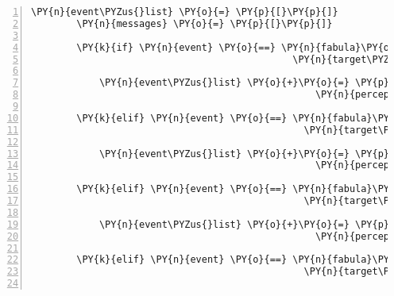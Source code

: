 \begin{Verbatim}[commandchars=\\\{\},numbers=left,firstnumber=1,stepnumber=1]
        \PY{n}{event\PYZus{}list} \PY{o}{=} \PY{p}{[}\PY{p}{]}
        \PY{n}{messages} \PY{o}{=} \PY{p}{[}\PY{p}{]}

        \PY{k}{if} \PY{n}{event} \PY{o}{==} \PY{n}{fabula}\PY{o}{.}\PY{n}{TriesToLookAtEvent}\PY{p}{(}\PY{n}{identifier}\PY{o}{=}\PY{n}{ID\PYZus{}KUNI}\PY{p}{,}
                                              \PY{n}{target\PYZus{}identifier}\PY{o}{=}\PY{l+s}{\PYZsq{}}\PY{l+s}{teleport\PYZus{}room\PYZus{}kuni}\PY{l+s}{\PYZsq{}}\PY{p}{)}\PY{p}{:}

            \PY{n}{event\PYZus{}list} \PY{o}{+}\PY{o}{=} \PY{p}{[}\PY{n}{fabula}\PY{o}{.}\PY{n}{PerceptionEvent}\PY{p}{(}\PY{n}{identifier}\PY{o}{=}\PY{n}{ID\PYZus{}KUNI}\PY{p}{,}
                                                  \PY{n}{perception}\PY{o}{=}\PY{l+s}{\PYZsq{}}\PY{l+s}{Hier gehts zurück, wo ich hergekommen bin!}\PY{l+s}{\PYZsq{}}\PY{p}{)}\PY{p}{]}

        \PY{k}{elif} \PY{n}{event} \PY{o}{==} \PY{n}{fabula}\PY{o}{.}\PY{n}{TriesToLookAtEvent}\PY{p}{(}\PY{n}{identifier}\PY{o}{=}\PY{n}{ID\PYZus{}KUNI}\PY{p}{,}
                                                \PY{n}{target\PYZus{}identifier}\PY{o}{=}\PY{l+s}{\PYZsq{}}\PY{l+s}{teleport\PYZus{}room\PYZus{}cassandra}\PY{l+s}{\PYZsq{}}\PY{p}{)}\PY{p}{:}

            \PY{n}{event\PYZus{}list} \PY{o}{+}\PY{o}{=} \PY{p}{[}\PY{n}{fabula}\PY{o}{.}\PY{n}{PerceptionEvent}\PY{p}{(}\PY{n}{identifier}\PY{o}{=}\PY{n}{ID\PYZus{}KUNI}\PY{p}{,}
                                                  \PY{n}{perception}\PY{o}{=}\PY{l+s}{\PYZsq{}}\PY{l+s}{Weg für Gnome verboten!}\PY{l+s}{\PYZsq{}}\PY{p}{)}\PY{p}{]}

        \PY{k}{elif} \PY{n}{event} \PY{o}{==} \PY{n}{fabula}\PY{o}{.}\PY{n}{TriesToLookAtEvent}\PY{p}{(}\PY{n}{identifier}\PY{o}{=}\PY{n}{ID\PYZus{}CASSANDRA}\PY{p}{,}
                                                \PY{n}{target\PYZus{}identifier}\PY{o}{=}\PY{l+s}{\PYZsq{}}\PY{l+s}{teleport\PYZus{}room\PYZus{}cassandra}\PY{l+s}{\PYZsq{}}\PY{p}{)}\PY{p}{:}

            \PY{n}{event\PYZus{}list} \PY{o}{+}\PY{o}{=} \PY{p}{[}\PY{n}{fabula}\PY{o}{.}\PY{n}{PerceptionEvent}\PY{p}{(}\PY{n}{identifier}\PY{o}{=}\PY{n}{ID\PYZus{}CASSANDRA}\PY{p}{,}
                                                  \PY{n}{perception}\PY{o}{=}\PY{l+s}{\PYZsq{}}\PY{l+s}{Dieser Weg führt zurück zum Fluss.}\PY{l+s}{\PYZsq{}}\PY{p}{)}\PY{p}{]}

        \PY{k}{elif} \PY{n}{event} \PY{o}{==} \PY{n}{fabula}\PY{o}{.}\PY{n}{TriesToLookAtEvent}\PY{p}{(}\PY{n}{identifier}\PY{o}{=}\PY{n}{ID\PYZus{}CASSANDRA}\PY{p}{,}
                                                \PY{n}{target\PYZus{}identifier}\PY{o}{=}\PY{l+s}{\PYZsq{}}\PY{l+s}{teleport\PYZus{}room\PYZus{}kuni}\PY{l+s}{\PYZsq{}}\PY{p}{)}\PY{p}{:}


\end{Verbatim}
